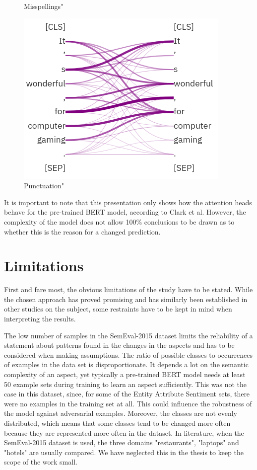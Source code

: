 \begin{figure}[H]
  \caption[BERT base attention heads - Misspellings]{Misspellings"}\label{fig:attention_typo}
\endminipage\hfill
{}%
  \includegraphics[width=\linewidth]{img/attention_punct.png}
  \caption[BERT base attention heads - Punctuation]{Punctuation"}\label{fig:attention_punct}
\endminipage
\end{figure}

It is important to note that this presentation only shows how the attention heads behave for the pre-trained BERT model, according to Clark et al. However, the complexity of the model does not allow 100\% conclusions to be drawn as to whether this is the reason for a changed prediction. 
\pagebreak

\section{Limitations}
First and fare most, the obvious limitations of the study have to be stated. While the chosen approach has proved promising and has similarly been established in other studies on the subject, some restraints have to be kept in mind when interpreting the results. 

The low number of samples in the SemEval-2015 dataset limits the reliability of a statement about patterns found in the changes in the aspects and has to be considered when making assumptions. The ratio of possible classes to occurrences of examples in the data set is disproportionate. It depends a lot on the semantic complexity of an aspect, yet typically a pre-trained BERT model needs at least 50 example sets during training to learn an aspect sufficiently. This was not the case in this dataset, since, for some of the Entity Attribute Sentiment sets, there were no examples in the training set at all. This could influence the robustness of the model against adversarial examples.
Moreover, the classes are not evenly distributed, which means that some classes tend to be changed more often because they are represented more often in the dataset. 
In literature, when the SemEval-2015 dataset is used, the three domains "restaurants", "laptops" and "hotels" are usually compared. We have neglected this in the thesis to keep the scope of the work small.

